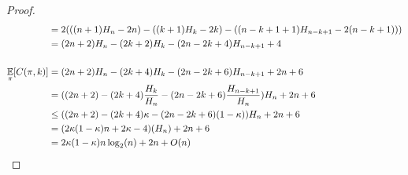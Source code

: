 \documentclass[11pt,a4paper,oneside]{article}
\newcommand{\E}{\mathop{\mathbb{E\/}}}
\begin{document}
\begin{problem}{9}
\begin{proof}
\[\begin{split}
            &= 2(((n + 1)H_n -2n) - ((k + 1)H_k -2k) - ((n - k + 1 + 1)H_{n - k + 1} - 2(n - k + 1)))\\
            &= (2n + 2)H_n - (2k + 2)H_k - (2n - 2k + 4)H_{n - k + 1} + 4\\\\
            \E_{\pi} [C(\pi,k)] &= (2n + 2)H_n - (2k + 4)H_k - (2n - 2k + 6)H_{n - k + 1} + 2n + 6\\
            &= ((2n + 2) - (2k + 4)\frac{H_k}{H_n} - (2n - 2k + 6)\frac{H_{n - k + 1}}{H_n})H_n + 2n + 6\\
            &\leq ((2n + 2) - (2k + 4)\kappa - (2n - 2k + 6)(1 - \kappa))H_{n} + 2n + 6 \\
            &= (2\kappa(1 - \kappa)n + 2\kappa - 4)(H_n) + 2n + 6\\
            &= 2\kappa(1 - \kappa)n\log_2(n) + 2n + O(n)
        \end{split}
    \]
\end{proof}
\end{problem}
\end{document}
